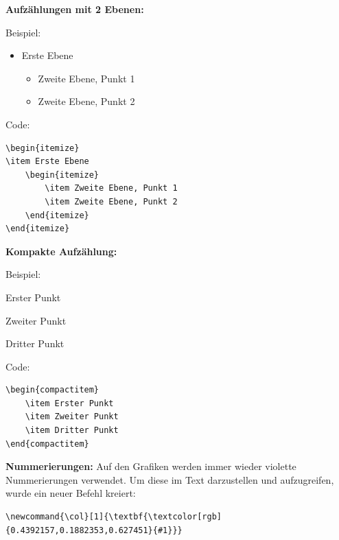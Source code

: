 \textbf{Aufzählungen mit 2 Ebenen:}

Beispiel:
\begin{itemize}
\item Erste Ebene
	\begin{itemize}
		\item Zweite Ebene, Punkt 1
		\item Zweite Ebene, Punkt 2
	\end{itemize}
\end{itemize}

Code:

\begin{verbatim}
\begin{itemize}
\item Erste Ebene
	\begin{itemize}
		\item Zweite Ebene, Punkt 1
		\item Zweite Ebene, Punkt 2
	\end{itemize}
\end{itemize}
\end{verbatim}

\textbf{Kompakte Aufzählung:}

Beispiel:\\
\begin{compactitem}
	\item Erster Punkt
	\item Zweiter Punkt
	\item Dritter Punkt
\end{compactitem}

\vspace{\baselineskip}

Code:

\begin{verbatim}
\begin{compactitem}
	\item Erster Punkt
	\item Zweiter Punkt
	\item Dritter Punkt
\end{compactitem}
\end{verbatim}

\vspace{\baselineskip}

\textbf{Nummerierungen:} 
Auf den Grafiken werden immer wieder violette Nummerierungen verwendet. Um diese im Text darzustellen und aufzugreifen, wurde ein neuer Befehl kreiert:

\begin{verbatim}
\newcommand{\col}[1]{\textbf{\textcolor[rgb]{0.4392157,0.1882353,0.627451}{#1}}}
\end{verbatim}

